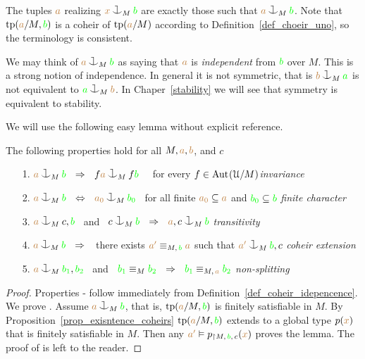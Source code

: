 The tuples ${\color{brown} a}$ realizing ${\mr x}\cnonfork_M{\gr b}$ are exactly those such that ${\mr a}\cnonfork_M{\gr b}$.
Note that ${\rm tp}({\color{brown} a}/M,{\color{green} b})$ is a coheir of ${\rm tp}({\color{brown} a}/M)$ according to Definition~\ref{def_choeir_uno}, so the terminology is consistent.

We may think of ${\mr a}\cnonfork_M{\gr b}$ as saying that 
${\color{brown} a}$ is \emph{independent\/} from ${\color{green} b}$ over $M$.
This is a strong notion of independence.
In general it is not symmetric, that is ${\mr b}\cnonfork_M{\gr a}$ is not equivalent to ${\gr a}\cnonfork_M{\mr b}$. In Chaper~\ref{stability} we will see that symmetry is equivalent to stability.

We will use the following easy lemma without explicit reference.

\begin{lemma}\label{lem_coheir_independence}
  The following properties hold for all $M,{\color{brown} a},{\color{brown} b}$, and $c$
  \begin{itemize}
  \item[1.] ${\mr a}\cnonfork_M{\gr b}\ \ \IMP\ \ f{\mr a}\cnonfork_Mf{\gr b}$ \ \ 
            for every $f\in{\rm Aut\kern.15ex}(\EuScript U/M)$\hfill \textit{invariance}
  \item[2.] ${\mr a}\cnonfork_M{\gr b}\ \ \IFF\ \ {\mr a_0}\cnonfork_M{\gr b_0}$
            \ for all finite ${\color{brown} a_0}\subseteq{\color{brown}a}$ and 
            ${\color{green} b_0}\subseteq{\color{green}b}$ \hfill\textit{finite character}
  \item[3.] ${\mr a}\cnonfork_Mc,{\gr b}$ \ and \ 
            $c\cnonfork_M{\gr b}\ \ \IMP\ \ {\mr a},c\cnonfork_M{\gr b}$
            \hfill\hfill\hfill\textit{transitivity}
  \item[4.] ${\mr a}\cnonfork_M{\gr b}\ \ \IMP\ \ $ 
            there exists ${\color{brown} a'}\equiv_{M,\,{\color{green} b}}{\color{brown} a}$ such that 
            ${\mr a'}\cnonfork_M{\gr b},c$
            \textit{coheir extension}
  \item[5.] ${\mr a}\cnonfork_M{\gr b_1},{\gr b_2}$ \ and \ 
  ${\color{green} b_1}\equiv_M{\color{green} b_2}\ \ \Rightarrow\ \ {\color{green} b_1}\equiv_{M,\,{\color{brown} a}}{\color{green} b_2}$
            \hspace{\stretch{20}}\textit{non-splitting}
  \end{itemize}
\end{lemma}
\begin{proof}
  Properties - follow immediately from Definition~\ref{def_coheir_idepencence}.
  We prove .
  Assume ${\mr a}\cnonfork_M{\gr b}$, that is, ${\rm tp}({\color{brown} a}/M,{\color{green} b})$ is finitely satisfiable in $M$.
  By Proposition~\ref{prop_exisntence_coheirs} ${\rm tp}({\color{brown} a}/M,{\color{green} b})$ extends to a global type $p({\color{brown} x})$ that is finitely satisfiable in $M$.
  Then any ${\color{brown} a'}\vDash p_{\restriction M,\,{\color{green} b},\,c}({\color{brown} x})$ proves the lemma.
  The proof of \ssf{5} is left to the reader.
\end{proof}

